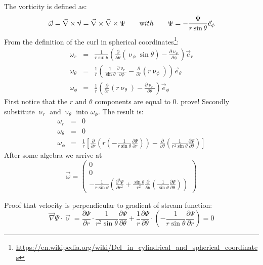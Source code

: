 The vorticity is defined as:
\[
\vec\omega = \vec\nabla \times \vec\upnu = \vec\nabla\times\vec\nabla\times \Psi
\qquad
{\text with}
\qquad
\Psi = -\frac{\Psi}{r \sin \theta} \vec{e}_\phi
\]
From the definition of the curl in spherical coordinates\footnote{\url{https://en.wikipedia.org/wiki/Del_in_cylindrical_and_spherical_coordinates}}:
\begin{eqnarray}
\omega_r &=& \frac{1}{r \sin\theta} \left( \frac{\partial}{\partial \theta}
(\upnu_\phi \sin\theta) - \frac{\partial \upnu_\theta}{\partial \phi}\right) \vec{e}_r \\
\omega_\theta &=& \frac{1}{r} \left( \frac{1}{\sin\theta} 
\frac{\partial \upnu_r}{\partial \phi} - \frac{\partial}{\partial r}
(r \upnu_\phi)  \right) \vec{e}_\theta \\
\omega_\phi &=& \frac{1}{r} \left( 
\frac{\partial}{\partial r} (r \upnu_\theta) - \frac{\partial \upnu_r}{\partial \theta}\right) \vec{e}_\phi 
\end{eqnarray}
First notice that the $r$ and $\theta$ components are equal to $0$. {\color{orange} prove!}
Secondly substitute $\upnu_r$ and $\upnu_\theta$ into $\omega_\phi$.
The result is:
\begin{eqnarray}
\omega_r &=& 0 \\
\omega_\theta &=& 0 \\
\omega_\phi &=& \frac{1}{r}
\left[
\frac{\partial }{\partial r} \left(r \left( -\frac{1}{r \sin \theta} \frac{\partial \Psi}{\partial r}
\right)\right) - \frac{\partial}{\partial \theta} \left( \frac{1}{r^2 \sin\theta} \frac{\partial \Psi}{\partial \theta}  \right)
\right]
\end{eqnarray}
After some algebra we arrive at
\[
\vec\omega
= 
\left(
\begin{array}{c}
0 \\ 0 \\
-\frac{1}{r \sin\theta} \left(  \frac{\partial^2 \Psi}{\partial r^2} 
+ \frac{\sin\theta}{r^2} \frac{\partial}{\partial \theta}
\left(
\frac{1}{\sin \theta} \frac{\partial \Psi}{\partial \theta}
\right)
\right)
\end{array}
\right)
\]

Proof that velocity is perpendicular to gradient of stream function:
\[
\vec\nabla \Psi \cdot \vec\upnu 
= \frac{\partial \Psi}{\partial r} \cdot \frac{1}{r^2 \sin\theta} \frac{\partial \Psi}{\partial \theta}
+ \frac{1}{r} \frac{\partial \Psi}{\partial \theta} \cdot
\left( 
-\frac{1}{r \sin\theta} \frac{\partial \Psi}{\partial r}
\right) 
=0
\]



